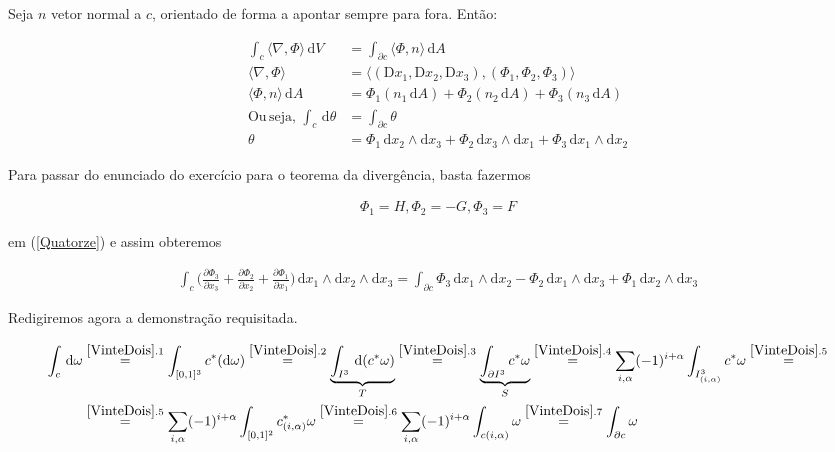 \documentclass[12pt,a4paper]{article}
\begin{document}
		Seja $n$ vetor normal a $c$, orientado de forma a apontar sempre para fora. Ent\~ao:

		\begin{align}
			\int_c \langle \nabla , \Phi \rangle \,\mathrm{d}V &= \int_{\partial c} \langle \Phi , n \rangle \,\mathrm{d}A \\
			\langle \nabla , \Phi \rangle &= \langle (\mathrm{D}x_1, \mathrm{D}x_2, \mathrm{D}x_3), (\Phi_1, \Phi_2, \Phi_3) \rangle \\
			\langle \Phi , n \rangle \,\mathrm{d}A &= \Phi_1 (n_1 \,\mathrm{d}A) + \Phi_2 (n_2 \,\mathrm{d}A) + \Phi_3 (n_3 \,\mathrm{d}A) \\
			\mathrm{Ou\,seja,\,} \int_c \,\mathrm{d}\theta &= \int_{\partial c} \theta \\
			\theta &= \Phi_1 \,\mathrm{d}x_2 \wedge\mathrm{d}x_3 + \Phi_2 \,\mathrm{d}x_3 \wedge\mathrm{d}x_1 + \Phi_3 \,\mathrm{d}x_1 \wedge\mathrm{d}x_2
		\end{align}

		Para passar do enunciado do exerc\'icio para o teorema da diverg\^encia, basta fazermos

		\begin{align}
			\Phi_1 = H, \Phi_2 = -G, \Phi_3 = F
		\end{align}

		em (\ref{Quatorze}) e assim obteremos

		\begin{align}
			\int_c \biggl( \frac{\partial \Phi_3}{\partial x_3} + \frac{\partial \Phi_2}{\partial x_2} + \frac{\partial \Phi_1}{\partial x_1} \biggl) \,\mathrm{d}x_1 \wedge\mathrm{d}x_2 \wedge\mathrm{d}x_3 = \int_{\partial c} \Phi_3 \,\mathrm{d}x_1 \wedge \mathrm{d}x_2 - \Phi_2 \,\mathrm{d}x_1 \wedge \mathrm{d}x_3 + \Phi_1 \,\mathrm{d}x_2 \wedge \mathrm{d}x_3
		\end{align}

		\begin{flushright}
		\end{flushright}

		Redigiremos agora a demonstra\c{c}\~ao requisitada.

		\begin{align}
			\int_c \,\mathrm{d}\omega &\stackrel{\ref{VinteDois}.1}{=} \int_{[0, 1]^3} c^*(\mathrm{d}\omega) \stackrel{\ref{VinteDois}.2}{=} \underbrace{\int_{I^3} \,\mathrm{d}(c^*\omega)}_\text{$T$} \stackrel{\ref{VinteDois}.3}{=} \underbrace{\int_{\partial I^3} c^*\omega}_\text{$S$} \stackrel{\ref{VinteDois}.4}{=} \sum_{i,\alpha} (-1)^{i + \alpha} \int_{I_{(i, \alpha)}^3} c^*\omega \stackrel{\ref{VinteDois}.5}{=} \label{VinteDois} \\
				&\stackrel{\ref{VinteDois}.5}{=} \sum_{i,\alpha} (-1)^{i + \alpha} \int_{[0,1]^2} c_{(i, \alpha)}^* \omega \stackrel{\ref{VinteDois}.6}{=} \sum_{i,\alpha} (-1)^{i + \alpha} \int_{c(i,\alpha)} \omega \stackrel{\ref{VinteDois}.7}{=} \int_{\partial c} \omega
		\end{align}
\end{document}
